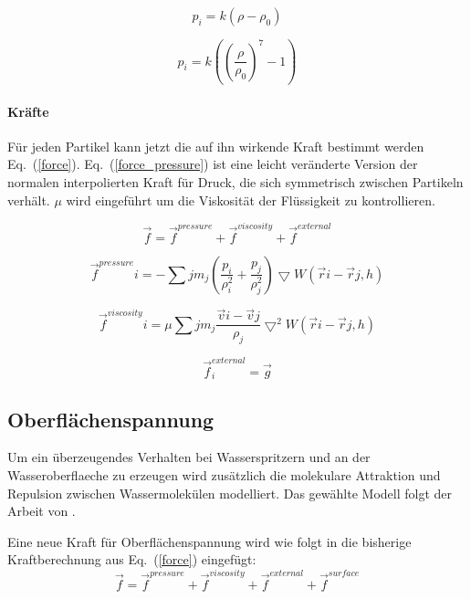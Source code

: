 \documentclass[a4paper]{paper}
\renewcommand{\eqref}[1]{Eq.~(\ref{#1})}
\begin{document}
\begin{equation}
\label{pressure}
p_i=k(\rho-\rho_0)
\end{equation}

\begin{equation}
\label{pressure_tait}
p_i = k((\frac{\rho}{\rho_{0}})^{7}-1)
\end{equation}


\paragraph{Kräfte}
Für jeden Partikel kann jetzt die auf ihn wirkende Kraft bestimmt werden \eqref{force}.
\eqref{force_pressure} ist eine leicht veränderte Version der normalen interpolierten Kraft für Druck, die sich symmetrisch zwischen Partikeln verhält.
$\mu$ wird eingeführt um die Viskosität der Flüssigkeit zu kontrollieren.

\begin{equation}
\label{force}
\vec{f} = \vec{f}^{pressure} + \vec{f}^{viscosity} + \vec{f}^{external}
\end{equation}

\begin{equation}
\label{force_pressure}
\vec{f}^{pressure}{i} = - \sum{j}m_{j}(\frac{p_{i}}{\rho_{i}^2} +\frac{p_{j}}{\rho_{j}^2})\bigtriangledown W(\vec{r}{i}-\vec{r}{j},h)
\end{equation}

\begin{equation}
\label{force_viscosity}
\vec{f}^{viscosity}{i} = \mu \sum{j}m_{j}\frac{\vec{v}{i} - \vec{v}{j}}{\rho_{j}}\bigtriangledown^2 W(\vec{r}{i}-\vec{r}{j},h)
\end{equation}

\begin{equation}
\label{force_external}
\vec{f}^{external}_{i} = \vec{g}
\end{equation}



\subsection{Oberflächenspannung}
Um ein überzeugendes Verhalten bei Wasserspritzern und an der Wasseroberflaeche zu erzeugen wird zusätzlich die molekulare Attraktion und Repulsion zwischen Wassermolekülen modelliert. Das gewählte Modell folgt der Arbeit von \citep{SurfaceTension}.

Eine neue Kraft für Oberflächenspannung wird wie folgt in die bisherige Kraftberechnung aus \eqref{force} eingefügt:
\begin{equation}
\label{force_with_surface}
\vec{f} = \vec{f}^{pressure} + \vec{f}^{viscosity} + \vec{f}^{external} + \vec{f}^{surface}
\end{equation}
\end{document}
